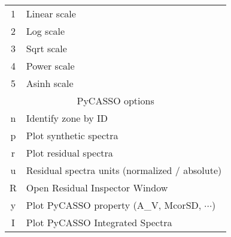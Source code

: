 \documentclass[11pt]{article}
\begin{document}
\begin{tabular} {c l}
1 & Linear scale \\
2 & Log scale \\
3 & Sqrt scale \\
4 & Power scale \\
5 & Asinh scale \\
\multicolumn{2}{c}{\cellcolor{MilkTea!25!white} PyCASSO options} \\
n & Identify zone by ID \\
p & Plot synthetic spectra \\
r & Plot residual spectra \\
u & Residual spectra units (normalized / absolute)\\
R & Open Residual Inspector Window\\
y & Plot PyCASSO property (A\_V, McorSD, $\cdots$) \\
I & Plot PyCASSO Integrated Spectra \\
\hline
\end{tabular}
\end{document}
